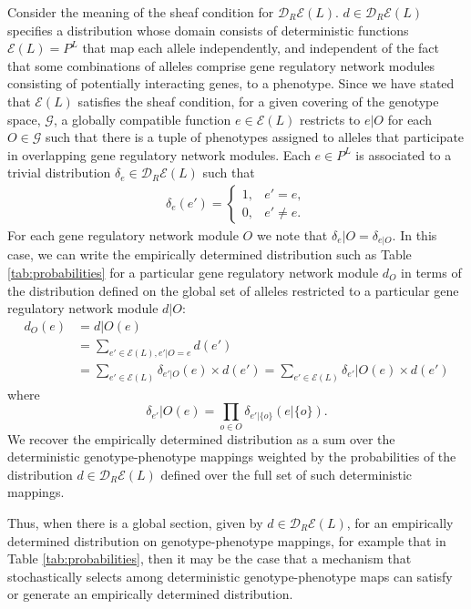 \documentclass[10pt]{article}
\begin{document}
Consider the meaning of the sheaf condition for $\mathcal{D}_R\mathcal{E}(L)$. $d \in \mathcal{D}_R\mathcal{E}(L)$ specifies a distribution whose domain consists of deterministic functions $\mathcal{E}(L) = P^L$ that map each allele independently, and independent of the fact that some combinations of alleles  comprise gene regulatory network modules consisting of potentially interacting genes, to a phenotype. Since we have stated that $\mathcal{E}(L)$ satisfies the sheaf condition, for a given covering of the genotype space, $\mathcal{G}$, a globally compatible function $e \in  \mathcal{E}(L)$ restricts to $e|O$ for each $O \in \mathcal{G}$ such that there is a tuple of phenotypes assigned to alleles that participate in overlapping gene regulatory network modules. Each $e \in P^L$ is associated to a trivial distribution $\delta_e \in \mathcal{D}_R\mathcal{E}(L)$ such that 
\begin{eqnarray}
\delta_e(e') =
\begin{cases}
1, & e' = e,\\
0, & e' \neq e.
\end{cases}
\end{eqnarray}
For each gene regulatory network module $O$ we note that $\delta_e|O = \delta_{e|O}$. In this case, we can write the empirically determined distribution such as Table \ref{tab:probabilities} for a particular gene regulatory network module $d_O$ in terms of the distribution defined on the global set of alleles restricted to a particular gene regulatory network module $d|O$:
\begin{equation}\label{eq:factordist}
\begin{split}
d_O(e) &= d|O(e)\\
&= \sum_{e' \in \mathcal{E}(L),e'|O=e} d(e')\\
&= \sum_{e' \in \mathcal{E}(L)} \delta_{e'|O}(e) \times d(e') = \sum_{e' \in \mathcal{E}(L)} \delta_{e'}|O(e) \times d(e')
\end{split}
\end{equation}
where
\begin{equation*}
\delta_{e'}|O(e) = \prod_{o \in O} \delta_{e'|\{o\}}(e|\{o\}).
\end{equation*}
We recover the empirically determined distribution as a sum over the deterministic genotype-phenotype mappings weighted by the probabilities of the distribution $d \in \mathcal{D}_R\mathcal{E}(L)$ defined over the full set of such deterministic mappings.

Thus, when there is a global section, given by $d \in \mathcal{D}_R\mathcal{E}(L)$, for an empirically determined distribution on genotype-phenotype mappings, for example that in Table \ref{tab:probabilities}, then it may be the case that a mechanism that stochastically selects among deterministic genotype-phenotype maps can satisfy or generate an empirically determined distribution.
\end{document}
